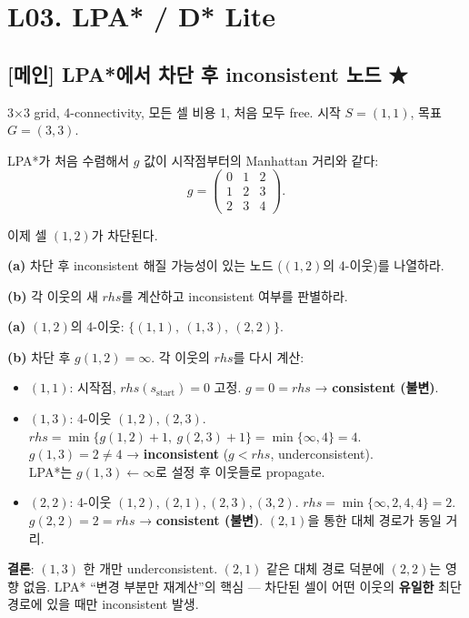 \documentclass[11pt,a4paper]{article}
\begin{document}
\section{L03. LPA* / D* Lite}

\subsection*{[메인] LPA*에서 차단 후 inconsistent 노드 \hfill ★}

\begin{prob}
3×3 grid, 4-connectivity, 모든 셀 비용 1, 처음 모두 free. 시작 $S = (1,1)$, 목표 $G = (3,3)$.

LPA*가 처음 수렴해서 $g$ 값이 시작점부터의 Manhattan 거리와 같다:
\[
g = \begin{pmatrix}0 & 1 & 2\\ 1 & 2 & 3\\ 2 & 3 & 4\end{pmatrix}.
\]

이제 셀 $(1, 2)$가 차단된다.

\textbf{(a)} 차단 후 inconsistent 해질 가능성이 있는 노드 ($(1,2)$의 4-이웃)를 나열하라.

\textbf{(b)} 각 이웃의 새 $rhs$를 계산하고 inconsistent 여부를 판별하라.
\end{prob}

\begin{sol}
\textbf{(a)} $(1,2)$의 4-이웃: $\{(1,1),\ (1,3),\ (2,2)\}$.

\textbf{(b)} 차단 후 $g(1,2) = \infty$. 각 이웃의 $rhs$를 다시 계산:

\begin{itemize}
\item $(1,1)$: 시작점, $rhs(s_{\text{start}}) = 0$ 고정. $g = 0 = rhs$ → \textbf{consistent (불변)}.

\item $(1,3)$: 4-이웃 $(1,2), (2,3)$. $rhs = \min\{g(1,2)+1,\ g(2,3)+1\} = \min\{\infty, 4\} = 4$.\\
$g(1,3) = 2 \ne 4$ → \textbf{inconsistent} ($g < rhs$, underconsistent).\\
LPA*는 $g(1,3) \leftarrow \infty$로 설정 후 이웃들로 propagate.

\item $(2,2)$: 4-이웃 $(1,2), (2,1), (2,3), (3,2)$. $rhs = \min\{\infty, 2, 4, 4\} = 2$.\\
$g(2,2) = 2 = rhs$ → \textbf{consistent (불변)}. $(2,1)$을 통한 대체 경로가 동일 거리.
\end{itemize}

\textbf{결론}: $(1,3)$ 한 개만 underconsistent. $(2,1)$ 같은 대체 경로 덕분에 $(2,2)$는 영향 없음. LPA* ``변경 부분만 재계산''의 핵심 — 차단된 셀이 어떤 이웃의 \textbf{유일한} 최단경로에 있을 때만 inconsistent 발생.
\end{sol}
\end{document}
